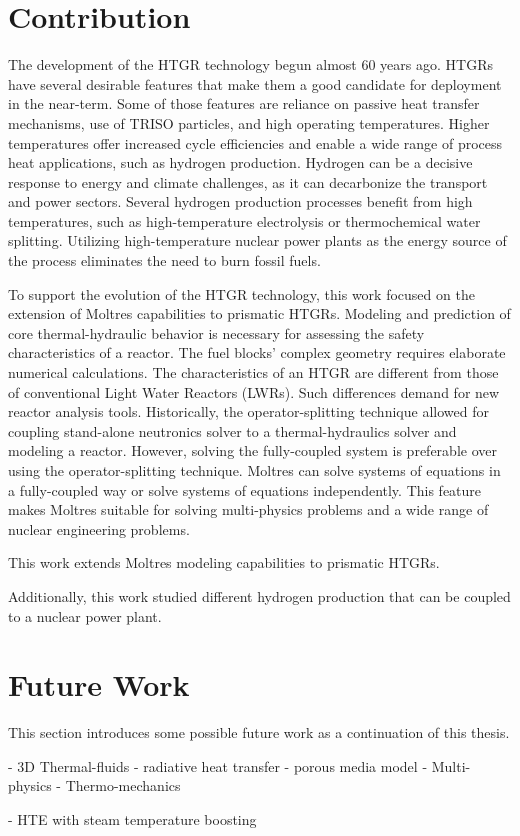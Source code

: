 \section{Contribution}

The development of the HTGR technology begun almost 60 years ago.
HTGRs have several desirable features that make them a good candidate for deployment in the near-term.
Some of those features are reliance on passive heat transfer mechanisms, use of TRISO particles, and high operating temperatures.
Higher temperatures offer increased cycle efficiencies and enable a wide range of process heat applications, such as hydrogen production.
Hydrogen can be a decisive response to energy and climate challenges, as it can decarbonize the transport and power sectors.
Several hydrogen production processes benefit from high temperatures, such as high-temperature electrolysis or thermochemical water splitting.
Utilizing high-temperature nuclear power plants as the energy source of the process eliminates the need to burn fossil fuels.

To support the evolution of the HTGR technology, this work focused on the extension of Moltres capabilities to prismatic HTGRs.
Modeling and prediction of core thermal-hydraulic behavior is necessary for assessing the safety characteristics of a reactor.
The fuel blocks’ complex geometry requires elaborate numerical calculations.
The characteristics of an HTGR are different from those of conventional Light Water Reactors (LWRs).
Such differences demand for new reactor analysis tools.
Historically, the operator-splitting technique allowed for coupling stand-alone neutronics solver to a thermal-hydraulics solver and modeling a reactor.
However, solving the fully-coupled system is preferable over using the operator-splitting technique.
Moltres can solve systems of equations in a fully-coupled way or solve systems of equations independently. This feature makes Moltres suitable for solving multi-physics problems and a wide range of nuclear engineering problems.

This work extends Moltres modeling capabilities to prismatic HTGRs.


Additionally, this work studied different hydrogen production that can be coupled to a nuclear power plant.


\section{Future Work}

This section introduces some possible future work as a continuation of this thesis.

- 3D Thermal-fluids
	- radiative heat transfer
	- porous media model
- Multi-physics
- Thermo-mechanics

- HTE with steam temperature boosting